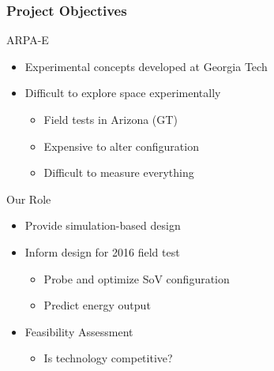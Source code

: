 \documentclass[mathserif]{beamer}
\begin{document}
%
%
%
\begin{frame}
\frametitle{Project Objectives}

 \begin{block}{ARPA-E}
  \begin{itemize}
   \item Experimental concepts developed at Georgia Tech
   \item Difficult to explore space experimentally
	 \begin{itemize}
	  \item Field tests in Arizona (GT)
	  \item Expensive to alter configuration
	  \item Difficult to measure everything
	 \end{itemize}	 
  \end{itemize}
 \end{block}

 \begin{block}{Our Role}
  \begin{itemize}
   \item Provide simulation-based design
   \item Inform design for 2016 field test
	 \begin{itemize}
	  \item Probe and optimize SoV configuration
	  \item Predict energy output
	 \end{itemize}
   \item Feasibility Assessment
	 \begin{itemize}
	  \item Is technology competitive?
	 \end{itemize}
  \end{itemize}
 \end{block}

\end{frame}
%
%
%
\end{document}
